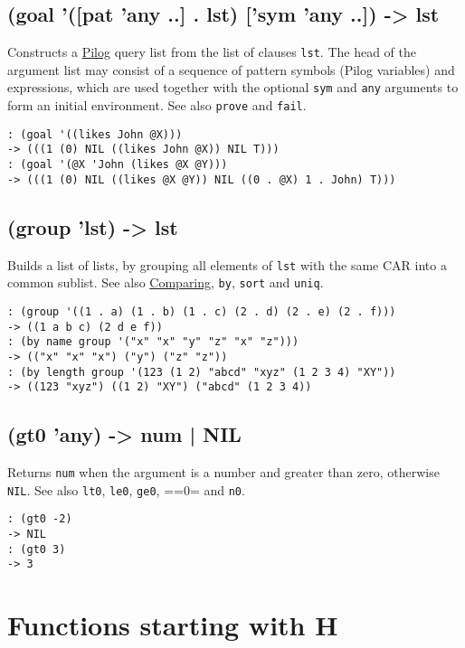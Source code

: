 {{{{{{ 
\section{(goal '([pat 'any ..] . lst) ['sym 'any ..]) -> lst}
\label{sec-8-1-7-9}


Constructs a \hyperref[ref.html-pilog]{Pilog} query list from the list of
clauses \texttt{lst}. The head of the argument list may consist of a sequence
of pattern symbols (Pilog variables) and expressions, which are used
together with the optional \texttt{sym} and \texttt{any} arguments to form an initial
environment. See also \texttt{prove} and \texttt{fail}.


\begin{verbatim}
: (goal '((likes John @X)))
-> (((1 (0) NIL ((likes John @X)) NIL T)))
: (goal '(@X 'John (likes @X @Y)))
-> (((1 (0) NIL ((likes @X @Y)) NIL ((0 . @X) 1 . John) T)))
\end{verbatim}

 
\section{(group 'lst) -> lst}
\label{sec-8-1-7-10}


Builds a list of lists, by grouping all elements of \texttt{lst} with the same
CAR into a common sublist. See also \hyperref[ref.html-cmp]{Comparing}, \texttt{by},
\texttt{sort} and \texttt{uniq}.


\begin{verbatim}
: (group '((1 . a) (1 . b) (1 . c) (2 . d) (2 . e) (2 . f)))
-> ((1 a b c) (2 d e f))
: (by name group '("x" "x" "y" "z" "x" "z")))
-> (("x" "x" "x") ("y") ("z" "z"))
: (by length group '(123 (1 2) "abcd" "xyz" (1 2 3 4) "XY"))
-> ((123 "xyz") ((1 2) "XY") ("abcd" (1 2 3 4))
\end{verbatim}

 
\section{(gt0 'any) -> num | NIL}
\label{sec-8-1-7-11}


Returns \texttt{num} when the argument is a number and greater than zero,
otherwise \texttt{NIL}. See also \texttt{lt0}, \texttt{le0}, \texttt{ge0}, ==0= and \texttt{n0}.


\begin{verbatim}
: (gt0 -2)
-> NIL
: (gt0 3)
-> 3
\end{verbatim}


\chapter{Functions starting with H}
\label{sec-8-1-8}


}}}}}}
